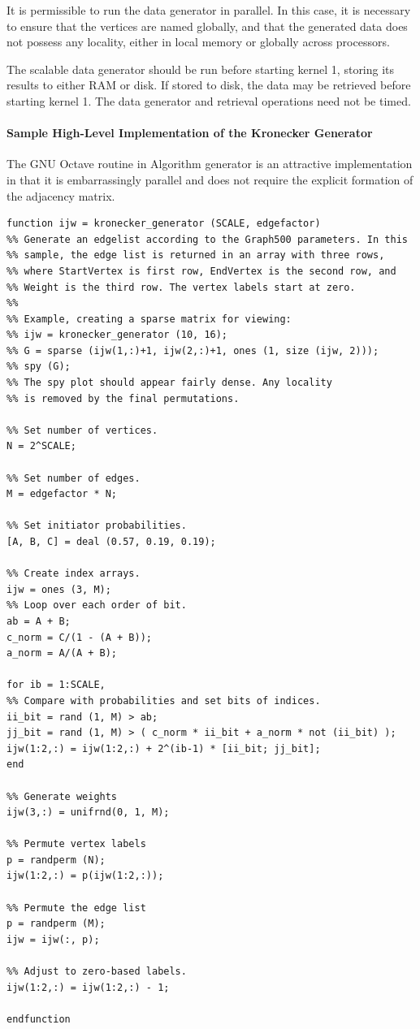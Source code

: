 \documentclass{article}
\begin{document}
It is permissible to run the data generator in parallel. In this case, it is necessary to ensure that the vertices are named globally, and that the generated data does not possess any locality, either in local memory or globally across processors.

The scalable data generator should be run before starting kernel 1, storing its results to either RAM or disk. If stored to disk, the data may be retrieved before starting kernel 1. The data generator and retrieval operations need not be timed.

\paragraph*{Sample High-Level Implementation of the Kronecker Generator}

The GNU Octave routine in Algorithm generator is an attractive implementation in that it is embarrassingly parallel and does not require the explicit formation of the adjacency matrix.

\begin{lstlisting}
function ijw = kronecker_generator (SCALE, edgefactor)
%% Generate an edgelist according to the Graph500 parameters. In this
%% sample, the edge list is returned in an array with three rows,
%% where StartVertex is first row, EndVertex is the second row, and
%% Weight is the third row. The vertex labels start at zero.
%%
%% Example, creating a sparse matrix for viewing:
%% ijw = kronecker_generator (10, 16);
%% G = sparse (ijw(1,:)+1, ijw(2,:)+1, ones (1, size (ijw, 2)));
%% spy (G);
%% The spy plot should appear fairly dense. Any locality
%% is removed by the final permutations.

%% Set number of vertices.
N = 2^SCALE;

%% Set number of edges.
M = edgefactor * N;

%% Set initiator probabilities.
[A, B, C] = deal (0.57, 0.19, 0.19);

%% Create index arrays.
ijw = ones (3, M);
%% Loop over each order of bit.
ab = A + B;
c_norm = C/(1 - (A + B));
a_norm = A/(A + B);

for ib = 1:SCALE,
%% Compare with probabilities and set bits of indices.
ii_bit = rand (1, M) > ab;
jj_bit = rand (1, M) > ( c_norm * ii_bit + a_norm * not (ii_bit) );
ijw(1:2,:) = ijw(1:2,:) + 2^(ib-1) * [ii_bit; jj_bit];
end

%% Generate weights
ijw(3,:) = unifrnd(0, 1, M);

%% Permute vertex labels
p = randperm (N);
ijw(1:2,:) = p(ijw(1:2,:));

%% Permute the edge list
p = randperm (M);
ijw = ijw(:, p);

%% Adjust to zero-based labels.
ijw(1:2,:) = ijw(1:2,:) - 1;

endfunction



\end{lstlisting}
\end{document}
